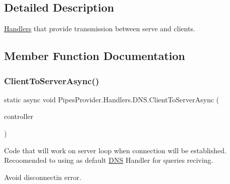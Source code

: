 \subsection{Detailed Description}
\mbox{\hyperlink{namespace_pipes_provider_1_1_handlers}{Handlers}} that provide transmission between serve and clients. 



\subsection{Member Function Documentation}
\mbox{\label{class_pipes_provider_1_1_handlers_1_1_d_n_s_a974e13bf084c0284e4cfe5fecdeb99f7}} 
\subsubsection{\texorpdfstring{Client\+To\+Server\+Async()}{ClientToServerAsync()}}
{\footnotesize\ttfamily static async void Pipes\+Provider.\+Handlers.\+D\+N\+S.\+Client\+To\+Server\+Async (\begin{DoxyParamCaption}\item[{\mbox{\hyperlink{class_pipes_provider_1_1_server_1_1_transmission_controllers_1_1_base_server_transmission_controller}{Base\+Server\+Transmission\+Controller}}}]{controller }\end{DoxyParamCaption})\hspace{0.3cm}{\ttfamily [static]}}



Code that will work on server loop when connection will be established. Recoomended to using as default \mbox{\hyperlink{class_pipes_provider_1_1_handlers_1_1_d_n_s}{D\+NS}} Handler for queries reciving. 

Avoid disconnectin error. \mbox{\label{class_pipes_provider_1_1_handlers_1_1_d_n_s_af052d964841594776956fc894642ef65}} 
